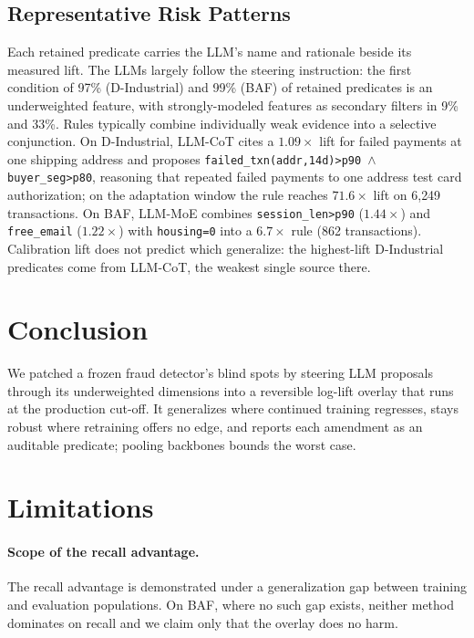 \documentclass[11pt]{article}
\begin{document}
\subsection{Representative Risk Patterns}
\label{sec:abl:patterns}

Each retained predicate carries the LLM's name and rationale beside its measured lift. The LLMs
largely follow the steering instruction: the first condition of 97\% (D-Industrial) and 99\% (BAF) of
retained predicates is an underweighted feature, with strongly-modeled features as secondary filters in
9\% and 33\%. Rules typically combine individually weak evidence into a selective conjunction. On
D-Industrial, LLM-CoT cites a $1.09\times$ lift for failed payments at one shipping address and proposes
\texttt{\scriptsize failed\_txn(addr,14d)>p90 $\wedge$ buyer\_seg>p80}, reasoning that repeated failed
payments to one address test card authorization; on the adaptation window the rule reaches
$71.6\times$ lift on 6{,}249 transactions. On BAF, LLM-MoE combines \texttt{\scriptsize session\_len>p90}
($1.44\times$) and \texttt{\scriptsize free\_email} ($1.22\times$) with \texttt{\scriptsize housing=0}
into a $6.7\times$ rule (862 transactions). Calibration lift does not predict which generalize: the
highest-lift D-Industrial predicates come from LLM-CoT, the weakest single source there.

\section{Conclusion}\label{sec:conclusion}

We patched a frozen fraud detector's blind spots by steering LLM proposals through its
underweighted dimensions into a reversible log-lift overlay that runs at the production cut-off. It
generalizes where continued training regresses, stays robust
where retraining offers no edge, and reports each amendment as an auditable predicate; pooling
backbones bounds the worst case.

\section*{Limitations}

\paragraph{Scope of the recall advantage.}
The recall advantage is demonstrated under a generalization gap between training and evaluation
populations. On BAF, where no such gap exists, neither method dominates on recall and we claim only
that the overlay does no harm.
\end{document}
